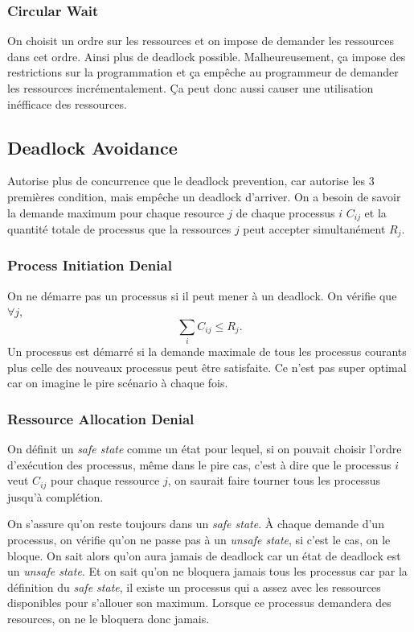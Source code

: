 \subsubsection{Circular Wait}
On choisit un ordre sur les ressources et on impose de demander les ressources dans cet ordre.
Ainsi plus de deadlock possible.
Malheureusement, ça impose des restrictions sur la programmation et ça empêche au programmeur
de demander les ressources incrémentalement.
Ça peut donc aussi causer une utilisation inéfficace des ressources.


\subsection{Deadlock Avoidance}
Autorise plus de concurrence que le deadlock prevention, car autorise les 3 premières condition, mais empêche un deadlock d'arriver.
On a besoin de savoir la demande maximum pour chaque resource $j$ de chaque processus $i$ $C_{ij}$
et la quantité totale de processus que la ressources $j$ peut accepter simultanément $R_j$.

\subsubsection{Process Initiation Denial}
On ne démarre pas un processus si il peut mener à un deadlock.
On vérifie que $\forall j$,
\[ \sum_{i} C_{ij} \leq R_j. \]
Un processus est démarré si la demande maximale de tous les processus courants plus celle des nouveaux processus peut être satisfaite.
Ce n'est pas super optimal car on imagine le pire scénario à chaque fois.

\subsubsection{Ressource Allocation Denial}
On définit un \emph{safe state} comme un état pour lequel,
si on pouvait choisir l'ordre d'exécution des processus,
même dans le pire cas, c'est à dire que le processus $i$ veut $C_{ij}$ pour chaque ressource $j$,
on saurait faire tourner tous les processus jusqu'à complétion.

On s'assure qu'on reste toujours dans un \emph{safe state}.
À chaque demande d'un processus, on vérifie qu'on ne passe pas à un \emph{unsafe state},
si c'est le cas, on le bloque.
On sait alors qu'on aura jamais de deadlock car un état de deadlock est un \emph{unsafe state}.
Et on sait qu'on ne bloquera jamais tous les processus car
par la définition du \emph{safe state}, il existe un processus qui a
assez avec les ressources disponibles pour s'allouer son maximum.
Lorsque ce processus demandera des resources, on ne le bloquera donc jamais.

